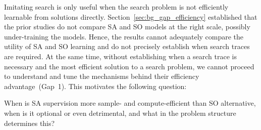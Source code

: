 Imitating search is only useful when the search problem is not efficiently learnable from solutions directly.
Section~\ref{sec:bg_gap_efficiency} established that the prior studies do not compare SA and SO models at the right scale, possibly under-training the models.
Hence, the results cannot adequately compare the utility of SA and SO learning and do not precisely establish when search traces are required.
At the same time, without establishing when a search trace is necessary and the most efficient solution to a search problem, we cannot proceed to understand and tune the mechanisms behind their efficiency advantage~(Gap~1).
This motivates the following question:

\begin{tcolorbox}[title=Research Question 1, colback=ThesisGreen!5, colframe=ThesisGreen, fonttitle=\bfseries, fontupper=\itshape]
When is SA supervision more sample- and compute-efficient than SO alternative, when is it optional or even detrimental, and what in the problem structure determines this?
\end{tcolorbox}


